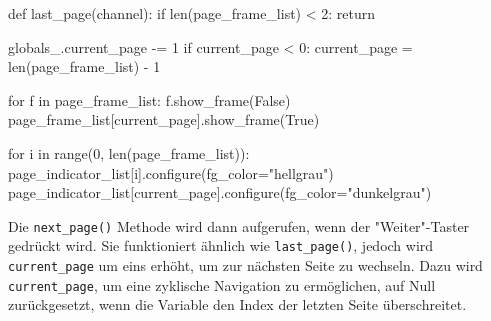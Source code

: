 \begin{pythoncode}
def last_page(channel):
    if len(page_frame_list) < 2:
        return

    globals_.current_page -= 1
    if current_page < 0:
        current_page = len(page_frame_list) - 1

    for f in page_frame_list:
        f.show_frame(False)
    page_frame_list[current_page].show_frame(True)  

    for i in range(0, len(page_frame_list)):
        page_indicator_list[i].configure(fg_color="hellgrau")
    page_indicator_list[current_page].configure(fg_color="dunkelgrau")
\end{pythoncode}

Die \lstinline{next_page()} Methode wird dann aufgerufen, wenn der "Weiter"-Taster gedrückt wird. Sie funktioniert ähnlich wie \lstinline{last_page()}, jedoch wird \lstinline{current_page} um eins erhöht, um zur nächsten Seite zu wechseln. Dazu wird \lstinline{current_page}, um eine zyklische Navigation zu ermöglichen, auf Null zurückgesetzt, wenn die Variable den Index der letzten Seite überschreitet.

